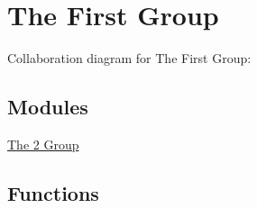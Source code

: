 \hypertarget{group__group1}{}\section{The First Group}
\label{group__group1}
Collaboration diagram for The First Group\+:
\subsection*{Modules}
\begin{DoxyCompactItemize}
\item 
\hyperlink{group__group2}{The 2 Group}
\end{DoxyCompactItemize}
\subsection*{Functions}
